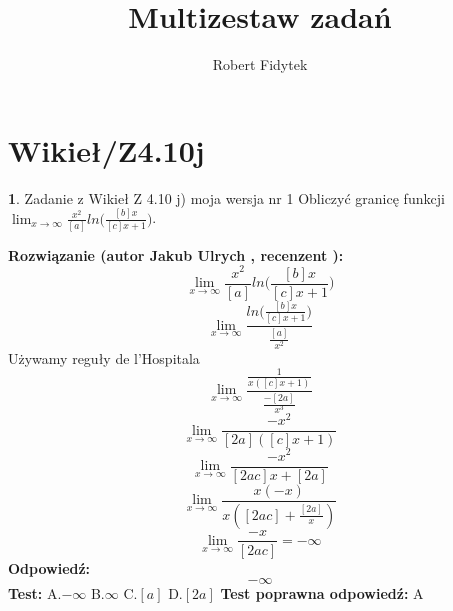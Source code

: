 \documentclass[12pt, a4paper]{article}
\title{Multizestaw zadań}
\author{Robert Fidytek}
\date{}
\theoremstyle{definition} %
\newtheorem{zad}{}
\newcommand{\kategoria}[1]{\section{#1}} %
\newcommand{\zadStart}[1]{\begin{zad}#1\newline} %
\newcommand{\zadStop}{\end{zad}}   %
\newcommand{\rozwStart}[2]{\noindent \textbf{Rozwiązanie (autor #1 , recenzent #2): }\newline} %
\newcommand{\rozwStop}{\newline}                                            %
\newcommand{\odpStart}{\noindent \textbf{Odpowiedź:}\newline}    %
\newcommand{\odpStop}{\newline}                                             %
\newcommand{\testStart}{\noindent \textbf{Test:}\newline} %
\newcommand{\testStop}{\newline} %
\newcommand{\kluczStart}{\noindent \textbf{Test poprawna odpowiedź:}\newline} %
\newcommand{\kluczStop}{\newline} %
\begin{document}
\maketitle


\kategoria{Wikieł/Z4.10j}
\zadStart{Zadanie z Wikieł Z 4.10 j) moja wersja nr 1}
Obliczyć granicę funkcji $\lim_{x \to \infty}\frac{x^{2}}{[a]}ln\big(\frac{[b]x}{[c]x+1}\big)$.
\zadStop
\rozwStart{Jakub Ulrych}{}
$$\lim_{x \to \infty}\frac{x^{2}}{[a]}ln\big(\frac{[b]x}{[c]x+1}\big)$$
$$\lim_{x \to \infty}\frac{ln\big(\frac{[b]x}{[c]x+1}\big)}{\frac{[a]}{x^{2}}}$$
Używamy reguły de l'Hospitala
$$\lim_{x \to \infty}\frac{\frac{1}{x([c]x+1)}}{\frac{-[2a]}{x^{3}}}$$
$$\lim_{x \to \infty}\frac{-x^{2}}{[2a]([c]x+1)}$$
$$\lim_{x \to \infty}\frac{-x^{2}}{[2ac]x+[2a]}$$
$$\lim_{x \to \infty}\frac{x(-x)}{x([2ac]+\frac{[2a]}{x})}$$
$$\lim_{x \to \infty}\frac{-x}{[2ac]}=-\infty$$
\rozwStop
\odpStart
$$-\infty$$
\odpStop
\testStart
A.$-\infty$
B.$\infty$
C.$[a]$
D.$[2a]$
\testStop
\kluczStart
A
\kluczStop
\end{document}
